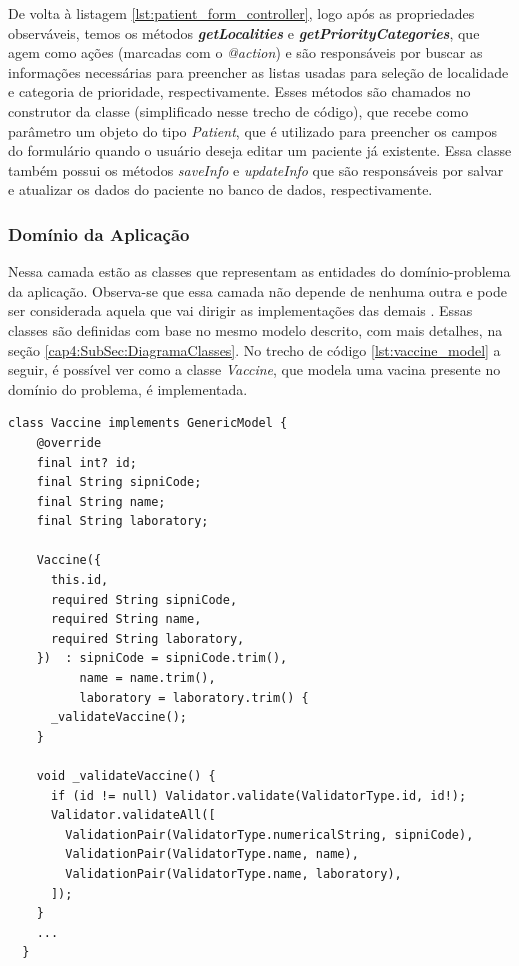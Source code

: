 De volta à listagem \ref{lst:patient_form_controller}, logo após as propriedades observáveis, temos os métodos \textbf{\textit{getLocalities}} e \textit{\textbf{getPriorityCategories}}, que agem como ações (marcadas com o \textit{@action}) e são responsáveis por buscar as informações necessárias para preencher as listas usadas para seleção de localidade e categoria de prioridade, respectivamente. Esses métodos são chamados no construtor da classe (simplificado nesse trecho de código), que recebe como parâmetro um objeto do tipo \textit{Patient}, que é utilizado para preencher os campos do formulário quando o usuário deseja editar um paciente já existente. Essa classe também possui os métodos \textit{saveInfo} e \textit{updateInfo} que são responsáveis por salvar e atualizar os dados do paciente no banco de dados, respectivamente.

\subsubsection{Domínio da Aplicação}
\label{cap4:SubSubSec:Dominio}
Nessa camada estão as classes que representam as entidades do domínio-problema da aplicação. Observa-se que essa camada não depende de nenhuma outra e pode ser considerada aquela que vai dirigir as implementações das demais \cite{evans2017domain}. Essas classes são definidas com base no mesmo modelo descrito, com mais detalhes, na seção \ref{cap4:SubSec:DiagramaClasses}. No trecho de código \ref{lst:vaccine_model} a seguir, é possível ver como a classe \textit{Vaccine}, que modela uma vacina presente no domínio do problema, é implementada.

\begin{lstlisting}[caption={Trecho da implementação da classe \textbf{Vaccine}}, label={lst:vaccine_model}]
  class Vaccine implements GenericModel {
    @override
    final int? id;
    final String sipniCode;
    final String name;
    final String laboratory;

    Vaccine({
      this.id,
      required String sipniCode,
      required String name,
      required String laboratory,
    })  : sipniCode = sipniCode.trim(),
          name = name.trim(),
          laboratory = laboratory.trim() {
      _validateVaccine();
    }

    void _validateVaccine() {
      if (id != null) Validator.validate(ValidatorType.id, id!);
      Validator.validateAll([
        ValidationPair(ValidatorType.numericalString, sipniCode),
        ValidationPair(ValidatorType.name, name),
        ValidationPair(ValidatorType.name, laboratory),
      ]);
    }
    ...
  }
\end{lstlisting}

